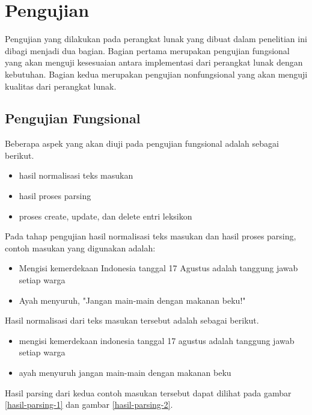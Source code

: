 \section{Pengujian}
\label{sec:pengujian}

Pengujian yang dilakukan pada perangkat lunak yang dibuat dalam penelitian ini dibagi menjadi dua bagian. Bagian pertama merupakan pengujian fungsional yang akan menguji kesesuaian antara implementasi dari perangkat lunak dengan kebutuhan. Bagian kedua merupakan pengujian nonfungsional yang akan menguji kualitas dari perangkat lunak.

\subsection{Pengujian Fungsional}
\label{sec:pengujianFungsional}

Beberapa aspek yang akan diuji pada pengujian fungsional adalah sebagai berikut.

\begin{itemize}
	\item hasil normalisasi teks masukan
	\item hasil proses parsing
	\item proses create, update, dan delete entri leksikon
\end{itemize}

Pada tahap pengujian hasil normalisasi teks masukan dan hasil proses parsing, contoh masukan yang digunakan adalah:

\begin{itemize}
	\item Mengisi kemerdekaan Indonesia tanggal 17 Agustus adalah tanggung jawab setiap warga
	\item Ayah menyuruh, "Jangan main-main dengan makanan beku!"
\end{itemize}

Hasil normalisasi dari teks masukan tersebut adalah sebagai berikut.

\begin{itemize}
	\item mengisi kemerdekaan indonesia tanggal 17 agustus adalah tanggung jawab setiap warga
	\item ayah menyuruh jangan main-main dengan makanan beku
\end{itemize}

Hasil parsing dari kedua contoh masukan tersebut dapat dilihat pada gambar \ref{hasil-parsing-1} dan gambar \ref{hasil-parsing-2}.

